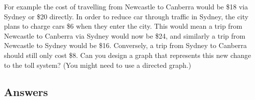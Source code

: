 \documentclass[a4paper,12pt]{article}
\begin{document}
\begin{enumerate}

For example the cost of travelling from Newcastle to Canberra 
would be \$18 via Sydney or \$20 directly. In order to reduce 
car through traffic in Sydney, the city plans to charge cars 
\$6 when they enter the city. This would mean a trip from 
Newcastle to Canberra via Sydney would now be \$24, and 
similarly a trip from Newcastle to Sydney would be \$16. 
Conversely, a trip from Sydney to Canberra should still only 
cost \$8.  Can you design a graph that represents this new change 
to the toll system? (You might need to use a directed graph.)


\end{enumerate}

\newpage
\subsection*{Answers}
\end{document}
